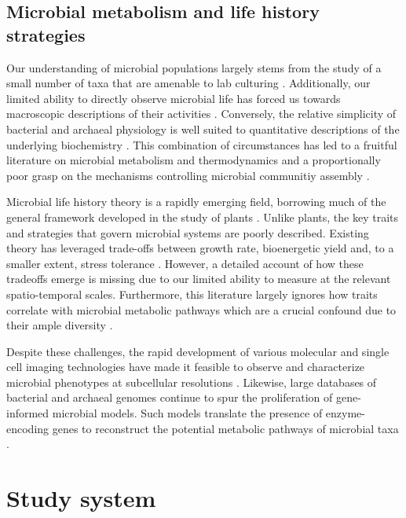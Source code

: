 \subsection{Microbial metabolism and life history strategies}

Our understanding of microbial populations largely stems from the study of a small number of taxa that are amenable to lab culturing \cite{rinke_insights_2013}. Additionally, our limited ability to directly observe microbial life has forced us towards macroscopic descriptions of their activities \cite{prosser2007a}. Conversely, the relative simplicity of bacterial and archaeal physiology is well suited to quantitative descriptions of the underlying biochemistry \cite{manzoni2012a}. This combination of circumstances has led to a fruitful literature on microbial metabolism and thermodynamics and a proportionally poor grasp on the mechanisms controlling microbial communitiy assembly \cite{van_den_berg_ecological_2022}. 

Microbial life history theory is a rapidly emerging field, borrowing much of the general framework developed in the study of plants \cite{malik2020a}. Unlike plants, the key traits and strategies that govern microbial systems are poorly described. Existing theory has leveraged trade-offs between growth rate, bioenergetic yield and, to a smaller extent, stress tolerance \cite{contois1959a, manhart_growth_2018}. However, a detailed account of how these tradeoffs emerge is missing due to our limited ability to measure at the relevant spatio-temporal scales. Furthermore, this literature largely ignores how traits correlate with microbial metabolic pathways which are a crucial confound due to their ample diversity \cite{manzoni2012a, thompson2017a}.

Despite these challenges, the rapid development of various molecular and single cell imaging technologies have made it feasible to observe and characterize microbial phenotypes at subcellular resolutions \cite{abbasian2018a, jafarpour2018a}. Likewise, large databases of bacterial and archaeal genomes continue to spur the proliferation of gene-informed microbial models. Such models translate the presence of enzyme-encoding genes to reconstruct the potential metabolic pathways of microbial taxa \cite{mccarty2007a, karaoz2022a}.

\section{Study system}


